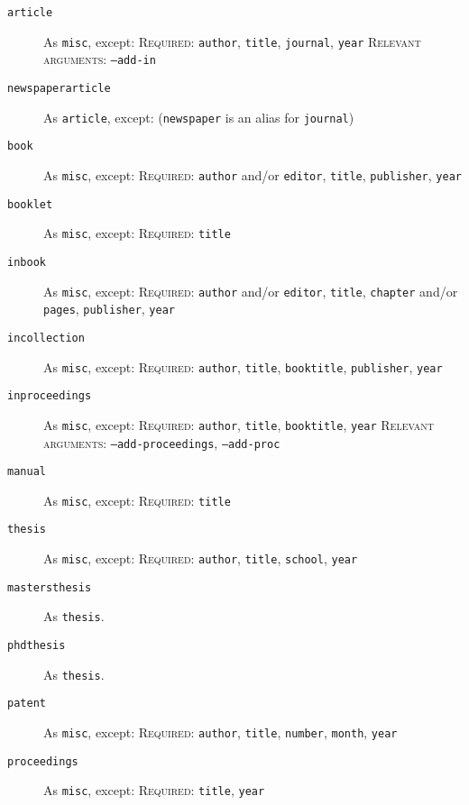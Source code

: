 \documentclass{article}
\begin{document}
\begin{description}
\item[\texttt{article}] As \texttt{misc}, except:
\textsc{Required:} \texttt{author}, \texttt{title}, \texttt{journal}, \texttt{year}
\textsc{Relevant arguments:} \texttt{--add-in}

\item[\texttt{newspaperarticle}] As \texttt{article}, except: (\texttt{newspaper} is an alias for \texttt{journal})

\item[\texttt{book}] As \texttt{misc}, except:
\textsc{Required:} \texttt{author} and/or \texttt{editor}, \texttt{title}, \texttt{publisher}, \texttt{year}

\item[\texttt{booklet}] As \texttt{misc}, except:
\textsc{Required:} \texttt{title}

\item[\texttt{inbook}] As \texttt{misc}, except:
\textsc{Required:} \texttt{author} and/or \texttt{editor}, \texttt{title}, \texttt{chapter} and/or \texttt{pages}, \texttt{publisher}, \texttt{year}

\item[\texttt{incollection}] As \texttt{misc}, except:
\textsc{Required:} \texttt{author}, \texttt{title}, \texttt{booktitle}, \texttt{publisher}, \texttt{year}

\item[\texttt{inproceedings}] As \texttt{misc}, except:
\textsc{Required:} \texttt{author}, \texttt{title}, \texttt{booktitle}, \texttt{year}
\textsc{Relevant arguments:} \texttt{--add-proceedings}, \texttt{--add-proc}

\item[\texttt{manual}] As \texttt{misc}, except:
\textsc{Required:} \texttt{title}

\item[\texttt{thesis}] As \texttt{misc}, except:
\textsc{Required:} \texttt{author}, \texttt{title}, \texttt{school}, \texttt{year}

\item[\texttt{mastersthesis}] As \texttt{thesis}.

\item[\texttt{phdthesis}] As \texttt{thesis}.

\item[\texttt{patent}] As \texttt{misc}, except:
\textsc{Required:} \texttt{author}, \texttt{title}, \texttt{number}, \texttt{month}, \texttt{year}

\item[\texttt{proceedings}] As \texttt{misc}, except:
\textsc{Required:} \texttt{title}, \texttt{year}


\end{description}
\end{document}
